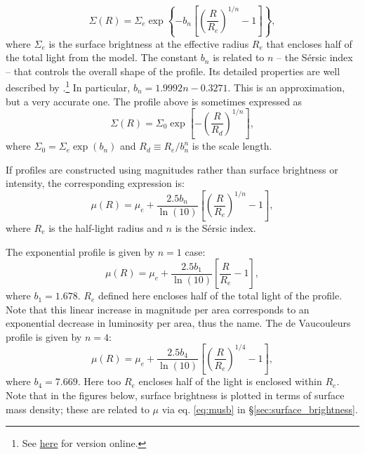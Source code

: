 \begin{equation}
\Sigma(R)=\Sigma_e\exp\left\{-b_n\left[\left(\frac{R}{R_e}\right)^{1/n}-1\right]\right\},
\label{eq:serspro}
\end{equation}
where $\Sigma_e$ is the surface brightness at the effective radius $R_e$ that encloses half of the total light from the model. The constant $b_n$ is related to $n$ -- the S\'ersic index -- that controls the overall shape of the profile.  Its detailed properties are well described by \href{http://adsabs.harvard.edu/abs/2005PASA...22..118G}{\citet{graham_driver05}}.\footnote{See \href{http://ned.ipac.caltech.edu/level5/March05/Graham/Graham2.html}{here} for version online.} In particular, $b_n = 1.9992n - 0.3271$. This is an approximation, but a very accurate one. The profile above is sometimes expressed as
\begin{equation}
\Sigma(R)=\Sigma_0\exp\left[-\left(\frac{R}{R_d}\right)^{1/n}\right],
\label{eq:serspro2}
\end{equation}
where $\Sigma_0=\Sigma_e \exp(b_n)$ and $R_d\equiv R_e/b_n^n$ is the scale length. 

If profiles are constructed using magnitudes rather than surface brightness or intensity, the corresponding expression is:  
\begin{equation}
\mu(R)=\mu_e+\frac{2.5b_n}{\ln(10)}\left[\left(\frac{R}{R_e}\right)^{1/n}-1\right], 
\label{eq:serpro}
\end{equation}
where $R_e$ is the half-light radius and $n$ is the S\'ersic index. 

The exponential profile is given by $n=1$ case:
\begin{equation}
\mu(R)=\mu_e+\frac{2.5b_1}{\ln(10)}\left[\frac{R}{R_e}-1\right],
\label{eq:exppro}
\end{equation}
where $b_1=1.678$. $R_e$ defined here encloses half of the total light of the profile. Note that this linear increase in magnitude per area corresponds to an exponential decrease in luminosity per area, thus the name. The de Vaucouleurs profile is given by $n=4$:
\begin{equation}
\mu(R)=\mu_e+\frac{2.5b_4}{\ln(10)}\left[\left(\frac{R}{R_e}\right)^{1/4}-1\right],
\label{eq:devpro}
\end{equation}
where $b_4=7.669$. Here too $R_e$ encloses half of the light is enclosed within $R_e$.
Note that in the figures below, surface brightness is plotted in terms of surface mass density; these are related to $\mu$ via eq. \ref{eq:musb} in \S \ref{sec:surface_brightness}.

